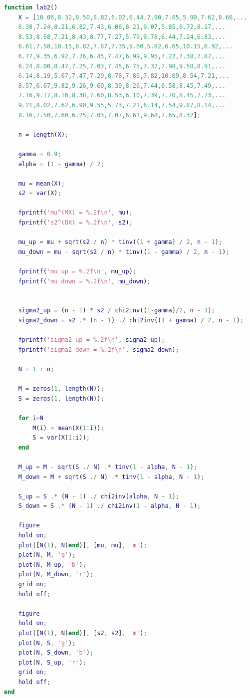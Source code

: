 \documentclass[12pt]{report}
\begin{document}
\begin{lstlisting}[language=Matlab]
function lab2()
	X = [10.06,8.32,8.50,8.82,6.02,6.44,7.90,7.85,5.90,7.62,8.66,...
	6.38,7.24,8.21,6.82,7.43,6.06,8.21,9.07,5.85,6.72,8.17,...
	8.53,8.68,7.21,8.43,8.77,7.27,5.79,9.78,6.44,7.24,6.83,...
	6.61,7.58,10.15,8.82,7.87,7.35,9.60,5.82,6.65,10.15,6.92,...
	6.77,9.35,6.92,7.76,6.45,7.47,6.99,9.95,7.22,7.38,7.87,...
	6.24,8.00,8.47,7.25,7.03,7.45,6.75,7.37,7.98,9.58,8.91,...
	6.14,8.19,5.07,7.47,7.29,8.78,7.86,7.82,10.09,8.54,7.21,...
	8.57,6.67,9.82,9.26,9.69,8.39,8.26,7.44,6.58,8.45,7.49,...
	7.16,9.17,8.16,8.38,7.60,8.53,6.10,7.39,7.70,8.45,7.73,...
	9.21,8.02,7.62,6.90,9.55,5.73,7.21,6.14,7.54,9.87,8.14,...
	8.16,7.50,7.60,6.25,7.03,7.07,6.61,9.68,7.65,8.32]; 
	
	n = length(X);
	
	gamma = 0.9;
	alpha = (1 - gamma) / 2;
	
	mu = mean(X);
	s2 = var(X);
	
	fprintf('mu^(MX) = %.2f\n', mu);
	fprintf('s2^(DX) = %.2f\n', s2);
	
	mu_up = mu + sqrt(s2 / n) * tinv((1 + gamma) / 2, n - 1);
	mu_down = mu - sqrt(s2 / n) * tinv((1 - gamma) / 2, n - 1);
	
	fprintf('mu up = %.2f\n', mu_up);
	fprintf('mu down = %.2f\n', mu_down);
	
	
	sigma2_up = (n - 1) * s2 / chi2inv((1-gamma)/2, n - 1);
	sigma2_down = s2 .* (n - 1) ./ chi2inv((1 + gamma) / 2, n - 1);
	
	fprintf('sigma2 up = %.2f\n', sigma2_up);
	fprintf('sigma2 down = %.2f\n', sigma2_down);
	
	N = 1 : n;
	
	M = zeros(1, length(N));
	S = zeros(1, length(N));
	
	for i=N
		M(i) = mean(X(1:i));
		S = var(X(1:i));	
	end
	
	M_up = M - sqrt(S ./ N) .* tinv(1 - alpha, N - 1);
	M_down = M + sqrt(S ./ N) .* tinv(1 - alpha, N - 1);
	
	S_up = S .* (N - 1) ./ chi2inv(alpha, N - 1);
	S_down = S .* (N - 1) ./ chi2inv(1 - alpha, N - 1);
	
	figure
	hold on;
	plot([N(1), N(end)], [mu, mu], 'm');
	plot(N, M, 'g');
	plot(N, M_up, 'b');
	plot(N, M_down, 'r');
	grid on;
	hold off;
	
	figure
	hold on;
	plot([N(1), N(end)], [s2, s2], 'm');
	plot(N, S, 'g');
	plot(N, S_down, 'b');
	plot(N, S_up, 'r');
	grid on;
	hold off;
end
\end{lstlisting}
\end{document}
